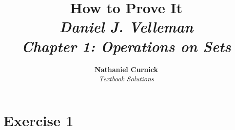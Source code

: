 \documentclass[11pt]{article}
\title{\textbf{How to Prove It} \\ {\Large\itshape Daniel J. Velleman} \\ {\Large\itshape Chapter 1: Operations on Sets}}
\author{\textbf{Nathaniel Curnick} \\ \textit{Textbook Solutions}}
\date{}
\begin{document}
\maketitle

\section*{Exercise 1}
\end{document}
